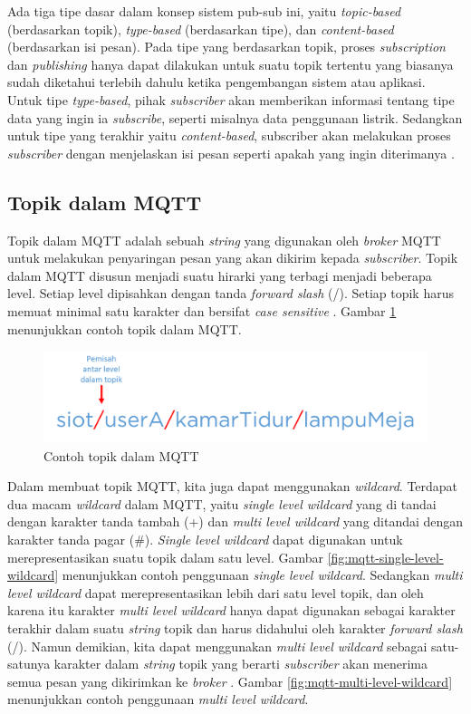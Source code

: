 Ada tiga tipe dasar dalam konsep sistem pub-sub ini, yaitu \textit{topic-based} (berdasarkan topik), \textit{type-based} (berdasarkan tipe), dan \textit{content-based} (berdasarkan isi pesan). Pada tipe yang berdasarkan topik, proses \textit{subscription} dan \textit{publishing} hanya dapat dilakukan untuk suatu topik tertentu yang biasanya sudah diketahui terlebih dahulu ketika pengembangan sistem atau aplikasi. Untuk tipe \textit{type-based}, pihak \textit{subscriber} akan memberikan informasi tentang tipe data yang ingin ia \textit{subscribe}, seperti misalnya data penggunaan listrik. Sedangkan untuk tipe yang terakhir yaitu \textit{content-based}, subscriber akan melakukan proses \textit{subscriber} dengan menjelaskan isi pesan seperti apakah yang ingin diterimanya \cite{hunkeler2008mqtt}.

\subsection{Topik dalam MQTT}
Topik dalam MQTT adalah sebuah \textit{string} yang digunakan oleh \textit{broker} MQTT untuk melakukan penyaringan pesan yang akan dikirim kepada \textit{subscriber}. Topik dalam MQTT disusun menjadi suatu hirarki yang terbagi menjadi beberapa level. Setiap level dipisahkan dengan tanda \textit{forward slash} (/). Setiap topik harus memuat minimal satu karakter dan bersifat \textit{case sensitive} \cite{hiveMQtopic}. Gambar \ref{fig:mqtt-topic} menunjukkan contoh topik dalam MQTT.

\begin{figure}
	\centering
	\includegraphics[width=.9\textwidth]{pics/mqtt-topic.PNG}
	\caption{Contoh topik dalam MQTT \cite{hiveMQtopic}}
	\label{fig:mqtt-topic}
\end{figure}

Dalam membuat topik MQTT, kita juga dapat menggunakan \textit{wildcard}. Terdapat dua macam \textit{wildcard} dalam MQTT, yaitu \textit{single level wildcard} yang di tandai dengan karakter tanda tambah (+) dan \textit{multi level wildcard} yang ditandai dengan karakter tanda pagar (\#). \textit{Single level wildcard} dapat digunakan untuk merepresentasikan suatu topik dalam satu level. Gambar \ref{fig:mqtt-single-level-wildcard} menunjukkan contoh penggunaan \textit{single level wildcard}. Sedangkan \textit{multi level wildcard} dapat merepresentasikan lebih dari satu level topik, dan oleh karena itu karakter \textit{multi level wildcard} hanya dapat digunakan sebagai karakter terakhir dalam suatu \textit{string} topik dan harus didahului oleh karakter \textit{forward slash} (/). Namun demikian, kita dapat menggunakan \textit{multi level wildcard} sebagai satu-satunya karakter dalam \textit{string} topik yang berarti \textit{subscriber} akan menerima semua pesan yang dikirimkan ke \textit{broker} \cite{hiveMQtopic}. Gambar \ref{fig:mqtt-multi-level-wildcard} menunjukkan contoh penggunaan \textit{multi level wildcard}.

